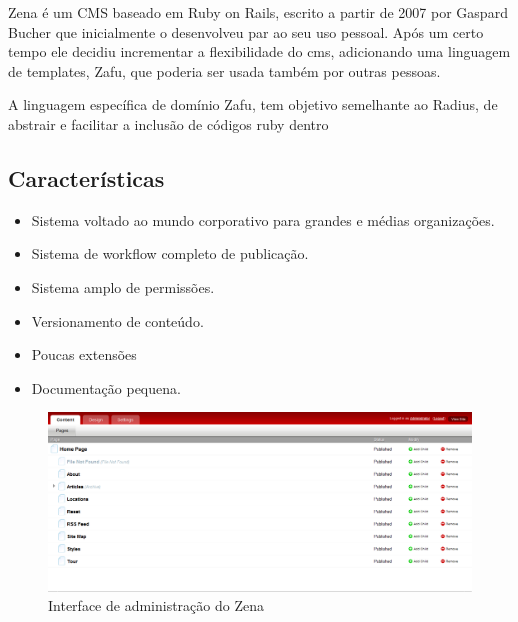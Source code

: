 Zena é um CMS baseado em Ruby on Rails, escrito a partir de 2007 por Gaspard Bucher que inicialmente o desenvolveu par ao seu uso pessoal. Após um certo tempo ele decidiu incrementar a flexibilidade do cms, adicionando uma linguagem de templates, Zafu, que poderia ser usada também por outras pessoas.

A linguagem específica de domínio Zafu, tem objetivo semelhante ao Radius, de abstrair e facilitar a inclusão de códigos ruby dentro 


\subsection{Características}

\begin{itemize}
  \item Sistema voltado ao mundo corporativo para grandes e médias organizações.
  \item Sistema de workflow completo de publicação.
  \item Sistema amplo de permissões.
  \item Versionamento de conteúdo.
  \item Poucas extensões 
  \item Documentação pequena.
\end{itemize}

\begin{figure}[here]
\includegraphics[width=150mm]{images/radiant_admin.png}
\caption{Interface de administração do Zena}
\label{fig:zena_admin.png}
\end{figure}

